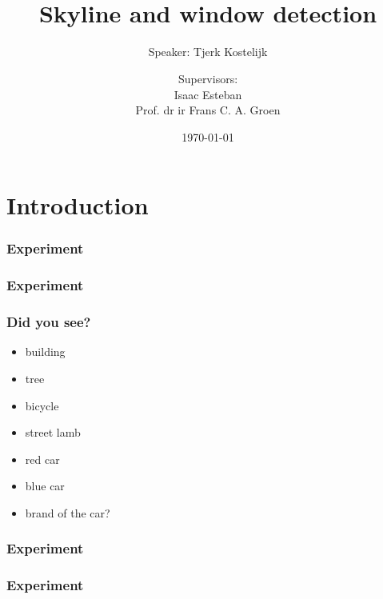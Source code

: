 \documentclass{beamer}
\title{\sc{Semantic annotation of urban scenes:}\\Skyline and window detection}
\subtitle{Speaker: Tjerk Kostelijk}
\author{Supervisors: \\Isaac Esteban\\Prof. dr ir Frans C. A. Groen}
\date{\today}
\begin{document}


\frame{\titlepage}




\section{Introduction}

\frame
{
	\frametitle{Experiment}
}


\frame
{
	\frametitle{Experiment}
}


\frame
{
	\frametitle{Did you see?}
	\begin{itemize}
		\item  <+-| alert@+> building
		\item  <+-| alert@+> tree
		\item  <+-| alert@+> bicycle
		\item  <+-| alert@+> street lamb
		\item  <+-| alert@+> red car
		\item  <+-| alert@+> blue car
		\item  <+-| alert@+> brand of the car?
	\end{itemize}
}


\frame
{
	\frametitle{Experiment}
}

\frame
{
	\frametitle{Experiment}
}
\end{document}
